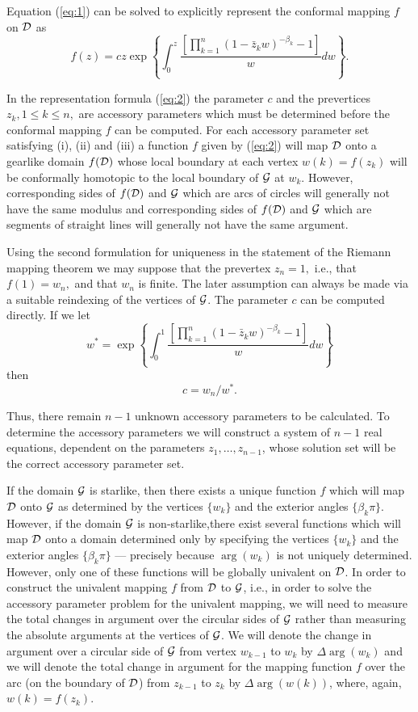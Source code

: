 \documentclass[12pt]{article}%
\begin{document}
Equation (\ref{eq:1}) can be solved to explicitly represent the conformal 
mapping $f$ on  ${\cal D}$ as
\renewcommand{\theequation}{\arabic{equation}}\setcounter{equation}{1}
\begin{equation} f(z)=cz
\exp\left\{\int^z_0\frac{\left[\displaystyle{\prod^n_{k=1}}(1-\bar{z}_kw)^{-\beta_k}-1\right]}{w}dw\right\}.\label{eq:2}\end{equation}

In the representation formula (\ref{eq:2}) the parameter $c$ and the 
prevertices $z_k, 1 \leq k \leq n,$ are accessory parameters which must 
be determined before the conformal mapping $f$ can be computed.  
For each accessory parameter set satisfying (i), (ii) and (iii) a  
function $f$ given by (\ref{eq:2}) will map  ${\cal D}$ onto a gearlike
domain $f({\cal D})$  
whose local boundary at each vertex $w(k) = f(z_k)$ will be 
conformally homotopic to the local boundary of ${\cal G}$ at $w_k.$  However, 
corresponding sides of $f({\cal D})$ and  ${\cal G}$  which are arcs of
circles will  
generally not have the same modulus and corresponding sides of
$f({\cal D})$ 
and  ${\cal G}$  which are segments of straight lines will generally not have 
the same argument.  

Using the second formulation for uniqueness in the statement 
of the Riemann mapping theorem we may suppose that the prevertex 
$z_n  = 1,$ i.e.,  that $f(1) = w_n,$ and that $w_n$  is finite.  The later 
assumption can always be made via a suitable reindexing of the 
vertices of  ${\cal G}$.  The parameter $c$ can be computed directly.  If we 
let $$w^*=
\exp\left\{\int^1_0\frac{\left[\displaystyle{\prod^n_{k=1}}(1-\bar{z}_kw)^{-\beta_k}-1\right]}
{w}dw\right\}$$ then $$c = w_n /w^* .$$

Thus, there remain $n-1$ unknown accessory parameters to be
calculated.  To determine the accessory parameters we will construct
a system of $n-1$ real equations, dependent on the parameters
$z_1,\ldots,z_{n-1}$, whose solution set will be the correct
accessory parameter set.

If the domain ${\cal G}$ is starlike, then there exists a unique
function $f$ which will map ${\cal D}$ onto ${\cal G}$ as determined
by the vertices $\{w_k\}$ and the exterior angles $\{\beta_k \pi\}$.
However, if the domain ${\cal G}$ is non-starlike,there exist several
functions which will map ${\cal D}$ onto a domain determined only by
specifying the vertices $\{w_k\}$ and the exterior angles $\{\beta_k\pi\}$ ---
precisely because $\arg (w_k)$ is not uniquely determined.  However,
only one of these functions will be globally univalent on ${\cal D}$.
 In order to construct the univalent mapping $f$ from ${\cal D}$ to
${\cal G}$, i.e., in order to solve the accessory parameter problem
for the univalent mapping, we will need to measure the total changes
in argument over the circular sides of ${\cal G}$ rather than
measuring the absolute arguments at the vertices of ${\cal G}$.  We
will denote the change in argument over a circular side of ${\cal G}$
from vertex $w_{k-1}$ to $w_k$ by $\Delta \arg (w_k)$ and we will denote
the total change in argument for the mapping function $f$ over the
arc (on the boundary of ${\cal D}$) from $z_{k-1}$ to $z_k$ by $\Delta
\arg (w(k))$, where, again, $w(k) = f(z_k)$.
\end{document}

